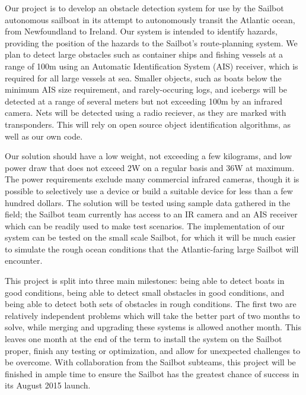 Our project is to develop an obstacle detection system for use by the Sailbot autonomous sailboat in its attempt to autonomously transit the Atlantic ocean, from Newfoundland to Ireland. Our system is intended to identify hazards, providing the position of the hazards to the Sailbot's route-planning system. We plan to detect large obstacles such as container ships and fishing vessels at a range of 100m using an Automatic Identification System (AIS) receiver, which is required for all large vessels at sea. Smaller objects, such as boats below the minimum AIS size requirement, and rarely-occuring logs, and icebergs will be detected at a range of several meters but not exceeding 100m by an infrared camera. Nets will be detected using a radio reciever, as they are marked with transponders. This will rely on open source object identification algorithms, as well as our own code.

Our solution should have a low weight, not exceeding a few kilograms, and low power draw that does not exceed 2W on a regular basis and 36W at maximum. The power requirements exclude many commercial infrared cameras, though it is possible to selectively use a device or build a suitable device for less than a few hundred dollars. The solution will be tested using sample data gathered in the field; the Sailbot team currently has access to an IR camera and an AIS receiver which can be readily used to make test scenarios. The implementation of our system can be tested on the small scale Sailbot, for which it will be much easier to simulate the rough ocean conditions that the Atlantic-faring large Sailbot will encounter.

This project is split into three main milestones: being able to detect boats in good conditions, being able to detect small obstacles in good conditions, and being able to detect both sets of obstacles in rough conditions. The first two are relatively independent problems which will take the better part of two months to solve, while merging and upgrading these systems is allowed another month. This leaves one month at the end of the term to install the system on the Sailbot proper, finish any testing or optimization, and allow for unexpected challenges to be overcome. With collaboration from the Sailbot subteams, this project will be finished in ample time to ensure the Sailbot has the greatest chance of success in its August 2015 launch.